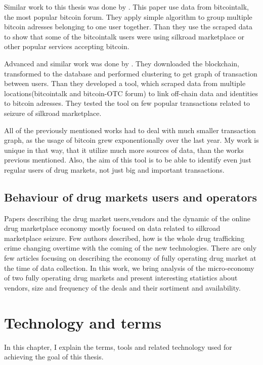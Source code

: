 \documentclass[
  digital, %
  table,   %
  lof,     %
  lot,     %
  oneside
]{fithesis3}
\begin{document}
Similar work to this thesis was done by \parencite{fleder2015bitcoin}. This paper use data from bitcointalk, the most popular bitcoin forum. 
They apply simple algorithm to group multiple bitcoin adresses belonging to one user together. Than they use the scraped data to show
that some of the bitcointalk users were using silkroad marketplace or other popular services accepting bitcoin.

Advanced and similar work was done by \parencite{spagnuolo2014bitiodine}. They downloaded the blockchain, transformed to the database
and performed clustering to get graph of transaction between users.
Than they developed a tool, which scraped data from multiple locations(bitcointalk and bitcoin-OTC forum) to link off-chain data and identities to bitcoin adresses.
They tested the tool on few popular transactions related to seizure of silkroad marketplace.

All of the previously mentioned works had to deal with much smaller transaction graph, as the usage of bitcoin grew exponentionally over the last year. 
My work is unique in that way, that it utilize much more sources of data, than the works previous mentioned. Also, the aim of this tool is to be able
to identify even just regular users of drug markets, not just big and important transactions.

\section{Behaviour of drug markets users and operators}

Papers describing the drug market users,vendors and the dynamic of
the online drug marketplace economy mostly focused on data related to silkroad marketplace seizure. 
Few authors described, how is the whole drug trafficking crime changing overtime with the coming of the new technologies.
There are only few articles focusing on describing the economy of fully operating drug market at the time of data collection.
In this work, we bring analysis of the micro-economy of two fully operating drug markets and present interesting statistics about vendors,
size and frequency of the deals and their sortiment and availability.

\chapter{Technology and terms}

In this chapter, I explain the terms, tools and related technology used for achieving the goal of this thesis.
\end{document}
